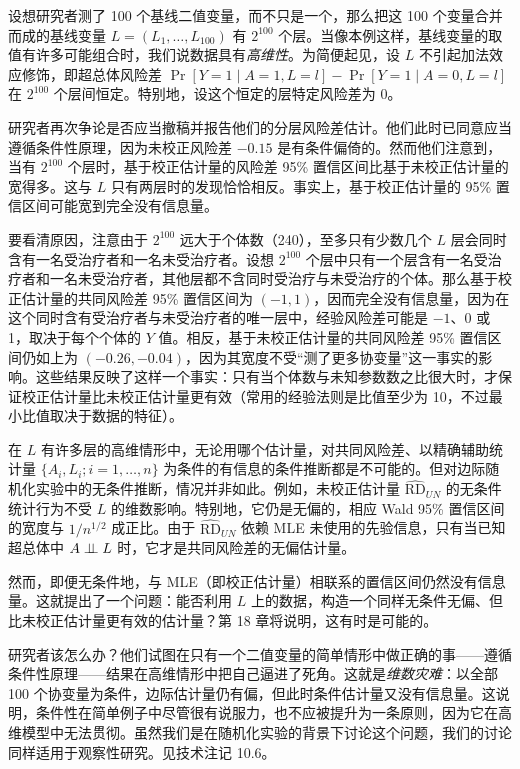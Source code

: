 设想研究者测了 100 个基线二值变量，而不只是一个，那么把这 100 个变量合并而成的基线变量 $L=(L_1,\dots,L_{100})$ 有 $2^{100}$ 个层。当像本例这样，基线变量的取值有许多可能组合时，我们说数据具有\emph{高维性}。为简便起见，设 $L$ 不引起加法效应修饰，即超总体风险差 $\Pr[Y=1\mid A=1,L=l]-\Pr[Y=1\mid A=0,L=l]$ 在 $2^{100}$ 个层间恒定。特别地，设这个恒定的层特定风险差为 0。

研究者再次争论是否应当撤稿并报告他们的分层风险差估计。他们此时已同意应当遵循条件性原理，因为未校正风险差 $-0.15$ 是有条件偏倚的。然而他们注意到，当有 $2^{100}$ 个层时，基于校正估计量的风险差 95\% 置信区间比基于未校正估计量的宽得多。这与 $L$ 只有两层时的发现恰恰相反。事实上，基于校正估计量的 95\% 置信区间可能宽到完全没有信息量。

要看清原因，注意由于 $2^{100}$ 远大于个体数（240），至多只有少数几个 $L$ 层会同时含有一名受治疗者和一名未受治疗者。设想 $2^{100}$ 个层中只有一个层含有一名受治疗者和一名未受治疗者，其他层都不含同时受治疗与未受治疗的个体。那么基于校正估计量的共同风险差 95\% 置信区间为 $(-1,1)$，因而完全没有信息量，因为在这个同时含有受治疗者与未受治疗者的唯一层中，经验风险差可能是 $-1$、0 或 1，取决于每个个体的 $Y$ 值。相反，基于未校正估计量的共同风险差 95\% 置信区间仍如上为 $(-0.26,-0.04)$，因为其宽度不受“测了更多协变量”这一事实的影响。这些结果反映了这样一个事实：只有当个体数与未知参数数之比很大时，才保证校正估计量比未校正估计量更有效（常用的经验法则是比值至少为 10，不过最小比值取决于数据的特征）。

\begin{techpoint}[维数灾难可以逆转吗？]
在 $L$ 有许多层的高维情形中，无论用哪个估计量，对共同风险差、以精确辅助统计量 $\{A_i,L_i;i=1,\dots,n\}$ 为条件的有信息的条件推断都是不可能的。但对边际随机化实验中的无条件推断，情况并非如此。例如，未校正估计量 $\widehat{\mathrm{RD}}_{UN}$ 的无条件统计行为不受 $L$ 的维数影响。特别地，它仍是无偏的，相应 Wald 95\% 置信区间的宽度与 $1/n^{1/2}$ 成正比。由于 $\widehat{\mathrm{RD}}_{UN}$ 依赖 MLE 未使用的先验信息，只有当已知超总体中 $A\perp\!\!\!\perp L$ 时，它才是共同风险差的无偏估计量。

然而，即便无条件地，与 MLE（即校正估计量）相联系的置信区间仍然没有信息量。这就提出了一个问题：能否利用 $L$ 上的数据，构造一个同样无条件无偏、但比未校正估计量更有效的估计量？第 18 章将说明，这有时是可能的。
\end{techpoint}

研究者该怎么办？他们试图在只有一个二值变量的简单情形中做正确的事——遵循条件性原理——结果在高维情形中把自己逼进了死角。这就是\emph{维数灾难}：以全部 100 个协变量为条件，边际估计量仍有偏，但此时条件估计量又没有信息量。这说明，条件性在简单例子中尽管很有说服力，也不应被提升为一条原则，因为它在高维模型中无法贯彻。虽然我们是在随机化实验的背景下讨论这个问题，我们的讨论同样适用于观察性研究。见技术注记 10.6。

